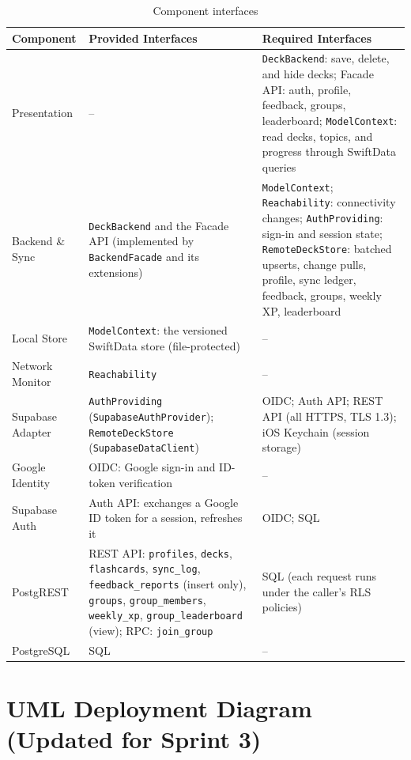 \documentclass[12pt,letterpaper]{article}
\begin{document}
\begin{table}[H]
\centering
\caption{Component interfaces}
\label{tab:interfaces}
\begin{tabularx}{\textwidth}{@{}L{2.8cm} Y Y@{}}
\toprule
\textbf{Component} & \textbf{Provided Interfaces} & \textbf{Required Interfaces} \\
\midrule
Presentation & -- & \texttt{DeckBackend}: save, delete, and hide decks; Facade API: auth, profile, feedback, groups, leaderboard; \texttt{ModelContext}: read decks, topics, and progress through SwiftData queries \\
Backend \& Sync & \texttt{DeckBackend} and the Facade API (implemented by \texttt{BackendFacade} and its extensions) & \texttt{ModelContext}; \texttt{Reachability}: connectivity changes; \texttt{AuthProviding}: sign-in and session state; \texttt{RemoteDeckStore}: batched upserts, change pulls, profile, sync ledger, feedback, groups, weekly XP, leaderboard \\
Local Store & \texttt{ModelContext}: the versioned SwiftData store (file-protected) & -- \\
Network Monitor & \texttt{Reachability} & -- \\
Supabase Adapter & \texttt{AuthProviding} (\texttt{SupabaseAuthProvider}); \texttt{RemoteDeckStore} (\texttt{SupabaseDataClient}) & OIDC; Auth API; REST API (all HTTPS, TLS 1.3); iOS Keychain (session storage) \\
Google Identity & OIDC: Google sign-in and ID-token verification & -- \\
Supabase Auth & Auth API: exchanges a Google ID token for a session, refreshes it & OIDC; SQL \\
PostgREST & REST API: \texttt{profiles}, \texttt{decks}, \texttt{flashcards}, \texttt{sync\_log}, \texttt{feedback\_reports} (insert only), \texttt{groups}, \texttt{group\_members}, \texttt{weekly\_xp}, \texttt{group\_leaderboard} (view); RPC: \texttt{join\_group} & SQL (each request runs under the caller's RLS policies) \\
PostgreSQL & SQL & -- \\
\bottomrule
\end{tabularx}
\end{table}

\section{UML Deployment Diagram (Updated for Sprint 3)}\label{sec:deploy}
\end{document}
